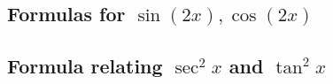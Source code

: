 \subsection{Formulas for $\sin (2x),\cos(2x)$}

\subsection{Formula relating $\sec^2 x $ and $\tan^2 x$}


